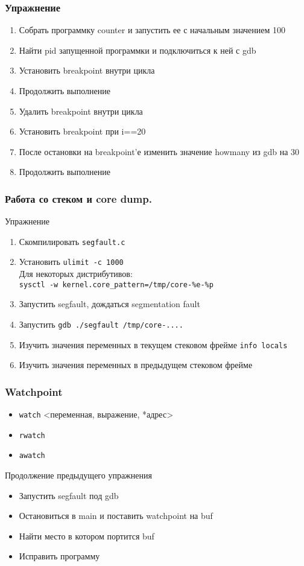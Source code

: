 \begin{frame}
  \frametitle{Упражнение}
  \begin{enumerate}
    \item Собрать программку counter и запустить ее с начальным значением 100
    \item Найти pid запущенной программки и подключиться к ней с gdb
    \item Установить breakpoint внутри цикла
    \item Продолжить выполнение
    \item Удалить breakpoint внутри цикла
    \item Установить breakpoint при i==20
    \item После остановки на breakpoint'е изменить значение howmany из gdb на 30
    \item Продолжить выполнение
  \end{enumerate}
\end{frame}

\begin{frame}
  \frametitle{Работа со стеком и core dump.}
  \begin{center}
    Упражнение
  \end{center}
  \begin{enumerate}
   \item Скомпилировать \texttt{segfault.c}
   \item Установить \texttt{ulimit -c 1000}\\
	   {\small Для некоторых дистрибутивов:\\ {\tt sysctl -w kernel.core\_pattern=/tmp/core-\%e-\%p}}
   \item Запустить segfault, дождаться segmentation fault
   \item Запустить \texttt{gdb ./segfault /tmp/core-....}
   \item Изучить значения переменных в текущем стековом фрейме \texttt{info locals}
   \item Изучить значения переменных в предыдущем стековом фрейме
  \end{enumerate}
\end{frame}

\begin{frame}
  \frametitle{Watchpoint}
  \begin{itemize}
    \item \texttt{watch} <переменная, выражение, *адрес>
    \item \texttt{rwatch} 
    \item \texttt{awatch}
  \end{itemize}
  \begin{center}
    Продолжение предыдущего упражнения
  \end{center}
  \begin{itemize}
    \item Запустить segfault под gdb
    \item Остановиться в main и поставить watchpoint на buf
    \item Найти место в котором портится buf
    \item Исправить программу
  \end{itemize}
\end{frame}

